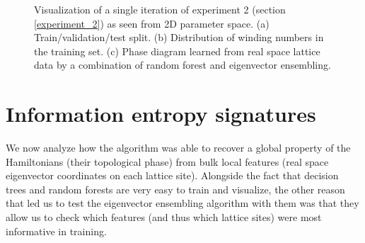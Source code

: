 \documentclass[10pt]{revtex4-1}
\begin{document}
\begin{figure}
\centering
{}\quad
{}
\caption{Visualization of a single iteration of experiment 2 (section \ref{experiment_2}) as seen from 2D parameter space. (a) Train/validation/test split. (b) Distribution of winding numbers in the training set. (c) Phase diagram learned from real space lattice data by a combination of random forest and eigenvector ensembling.}
\label{figexp2_exp}
\end{figure}

\section{Information entropy signatures}
\label{information_entropy_signatures}

We now analyze how the algorithm was able to recover a global property of the Hamiltonians (their topological phase) from bulk local features (real space eigenvector coordinates on each lattice site). Alongside the fact that decision trees and random forests are very easy to train and visualize, the other reason that led us to test the eigenvector ensembling algorithm with them was that they allow us to check which features (and thus which lattice sites) were most informative in training.
\end{document}
